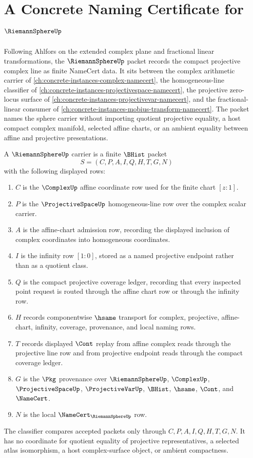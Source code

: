 \chapter{A Concrete Naming Certificate for $\RiemannSphereUp$}
\label{ch:concrete-instances-riemann-sphere-namecert}

Following Ahlfors on the extended complex plane and fractional linear transformations, the $\RiemannSphereUp$ packet records the compact projective complex line as finite NameCert data. It sits between the complex arithmetic carrier of \autoref{ch:concrete-instances-complex-namecert}, the homogeneous-line classifier of \autoref{ch:concrete-instances-projectivespace-namecert}, the projective zero-locus surface of \autoref{ch:concrete-instances-projectivevar-namecert}, and the fractional-linear consumer of \autoref{ch:concrete-instances-mobius-transform-namecert}. The packet names the sphere carrier without importing quotient projective equality, a host compact complex manifold, selected affine charts, or an ambient equality between affine and projective presentations.

\begin{definition}
\label{def:riemann-sphere-carrier}
A $\RiemannSphereUp$ carrier is a finite $\BHist$ packet
$$
S=(C,P,A,I,Q,H,T,G,N)
$$
with the following displayed rows:
\begin{enumerate}
\item $C$ is the $\ComplexUp$ affine coordinate row used for the finite chart $[z:1]$.
\item $P$ is the $\ProjectiveSpaceUp$ homogeneous-line row over the complex scalar carrier.
\item $A$ is the affine-chart admission row, recording the displayed inclusion of complex coordinates into homogeneous coordinates.
\item $I$ is the infinity row $[1:0]$, stored as a named projective endpoint rather than as a quotient class.
\item $Q$ is the compact projective coverage ledger, recording that every inspected point request is routed through the affine chart row or through the infinity row.
\item $H$ records componentwise $\hsame$ transport for complex, projective, affine-chart, infinity, coverage, provenance, and local naming rows.
\item $T$ records displayed $\Cont$ replay from affine complex reads through the projective line row and from projective endpoint reads through the compact coverage ledger.
\item $G$ is the $\Pkg$ provenance over $\RiemannSphereUp$, $\ComplexUp$, $\ProjectiveSpaceUp$, $\ProjectiveVarUp$, $\BHist$, $\hsame$, $\Cont$, and $\NameCert$.
\item $N$ is the local $\NameCert_{\RiemannSphereUp}$ row.
\end{enumerate}
The classifier compares accepted packets only through $C,P,A,I,Q,H,T,G,N$. It has no coordinate for quotient equality of projective representatives, a selected atlas isomorphism, a host complex-surface object, or ambient compactness.
\end{definition}

